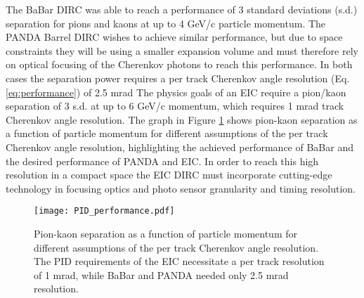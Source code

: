 \label{ch:eicdirc}
The BaBar DIRC was able to reach a performance of 3 standard deviations (s.d.) separation for pions and kaons at up to 4 GeV/c particle momentum. The PANDA Barrel DIRC wishes to achieve similar performance, but due to space constraints they will be using a smaller expansion volume and must therefore rely on optical focusing of the Cherenkov photons to reach this performance. In both cases the separation power requires a per track Cherenkov angle resolution (Eq. \ref{eq:performance}) of 2.5 mrad The physics goals of an EIC require a pion/kaon separation of 3 s.d. at up to 6 GeV/c momentum, which requires 1 mrad track Cherenkov angle resolution. The graph in Figure \ref{fig:PID_performance} shows pion-kaon separation as a function of particle momentum for different assumptions of the per track Cherenkov angle resolution, highlighting the achieved performance of BaBar and the desired performance of PANDA and EIC. In order to reach this high resolution in a compact space the EIC DIRC must incorporate cutting-edge technology in focusing optics and photo sensor granularity and timing resolution.

\begin{figure}[!htb]
	\centering
	\texttt{[image: PID\_performance.pdf]}
	\caption{Pion-kaon separation as a function of particle momentum for different assumptions of the per track Cherenkov angle resolution. The PID requirements of the EIC necessitate a per track resolution of 1 mrad, while BaBar and PANDA needed only 2.5 mrad resolution.}
	\label{fig:PID_performance}
\end{figure}


